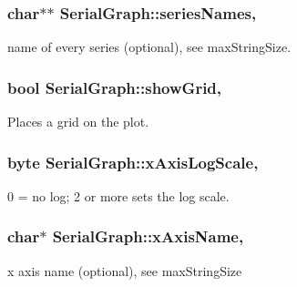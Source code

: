 \subsubsection[{series\+Names}]{\setlength{\rightskip}{0pt plus 5cm}char$\ast$$\ast$ Serial\+Graph\+::series\+Names\hspace{0.3cm}{\ttfamily [protected]}, {\ttfamily [inherited]}}\label{class_serial_graph_a2307e40e27249f44bbe14776dc68c561}
name of every series (optional), see max\+String\+Size. \hypertarget{class_serial_graph_ad61d5ea29eacc1611c5addc94714f1e2}{}
\subsubsection[{show\+Grid}]{\setlength{\rightskip}{0pt plus 5cm}bool Serial\+Graph\+::show\+Grid\hspace{0.3cm}{\ttfamily [protected]}, {\ttfamily [inherited]}}\label{class_serial_graph_ad61d5ea29eacc1611c5addc94714f1e2}
Places a grid on the plot. \hypertarget{class_serial_graph_afc2ca72fdfe2bc5e3159c9e910a8f81e}{}
\subsubsection[{x\+Axis\+Log\+Scale}]{\setlength{\rightskip}{0pt plus 5cm}byte Serial\+Graph\+::x\+Axis\+Log\+Scale\hspace{0.3cm}{\ttfamily [protected]}, {\ttfamily [inherited]}}\label{class_serial_graph_afc2ca72fdfe2bc5e3159c9e910a8f81e}
0 = no log; 2 or more sets the log scale. \hypertarget{class_serial_graph_a5f5bf85ed361ff567d0888eaa73e269c}{}
\subsubsection[{x\+Axis\+Name}]{\setlength{\rightskip}{0pt plus 5cm}char$\ast$ Serial\+Graph\+::x\+Axis\+Name\hspace{0.3cm}{\ttfamily [protected]}, {\ttfamily [inherited]}}\label{class_serial_graph_a5f5bf85ed361ff567d0888eaa73e269c}
x axis name (optional), see max\+String\+Size \hypertarget{class_serial_graph_a4dbd9cf190c591fb4f2f46a50d937199}{}
